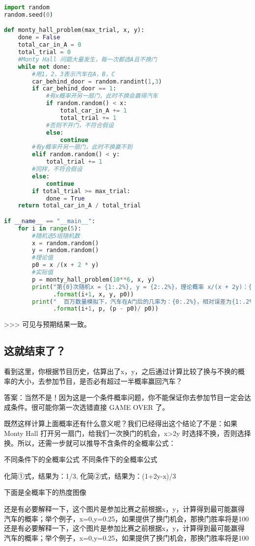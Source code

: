 \begin{lstlisting}[language=python]
import random
random.seed(0)

def monty_hall_problem(max_trial, x, y):
    done = False
    total_car_in_A = 0
    total_trial = 0
    #Monty Hall 问题大量发生，每一次都选A且不换门
    while not done:
        #用1，2，3表示汽车在A，B，C
        car_behind_door = random.randint(1,3)
        if car_behind_door == 1:
            #有x概率开另一扇门，此时不换会赢得汽车
            if random.random() < x:
                total_car_in_A += 1
                total_trial += 1
            #否则不开门，不符合假设
            else:
                continue
        #有y概率开另一扇门，此时不换赢不到
        elif random.random() < y:
            total_trial += 1
        #同样，不符合假设
        else:
            continue
        if total_trial >= max_trial:
            done = True
    return total_car_in_A / total_trial

if __name__ == "__main__":
    for i in range(5):
        #随机选5组随机数
        x = random.random()
        y = random.random()
        #理论值
        p0 = x /(x + 2 * y)
        #实际值
        p = monty_hall_problem(10**6, x, y)
        print("第{0}次随机x = {1:.2%}, y = {2:.2%}，理论概率 x/(x + 2y)：{3:.2%}"
              .format(i+1, x, y, p0))
        print("  百万数量模拟下，汽车在A门后的几率为：{0:.2%}，相对误差为{1:.2%}"
              .format(i+1, p, (p - p0)/ p0))
\end{lstlisting}
>>>
可见与预期结果一致。

\subsection{这就结束了？}
看到这里，你根据节目历史，估算出了x，y，之后通过计算比较了换与不换的概率的大小，去参加节目，是否必有超过一半概率赢回汽车？

答案：当然不是！因为这是一个条件概率问题，你不能保证你去参加节目一定会达成条件。很可能你第一次选错直接 GAME OVER 了。

既然这样计算上面概率还有什么意义呢？我们已经得出这个结论了不是：如果 Monty Hall 打开另一扇门，给我们一次换门的机会，x>2y 时选择不换，否则选择换。所以，还需一步就可以推导不含条件的全概率公式：

不同条件下的全概率公式
不同条件下的全概率公式

化简①式，结果为：1/3,
化简②式，结果为：(1+2y-x)/3

下面是全概率下的热度图像

还是有必要解释一下，这个图片是参加比赛之前根据x，y，计算得到最可能赢得汽车的概率；举个例子，x=0,y=0.25，如果提供了换门机会，那换门胜率将是100%
还是有必要解释一下，这个图片是参加比赛之前根据x，y，计算得到最可能赢得汽车的概率；举个例子，x=0,y=0.25，如果提供了换门机会，那换门胜率将是100%

